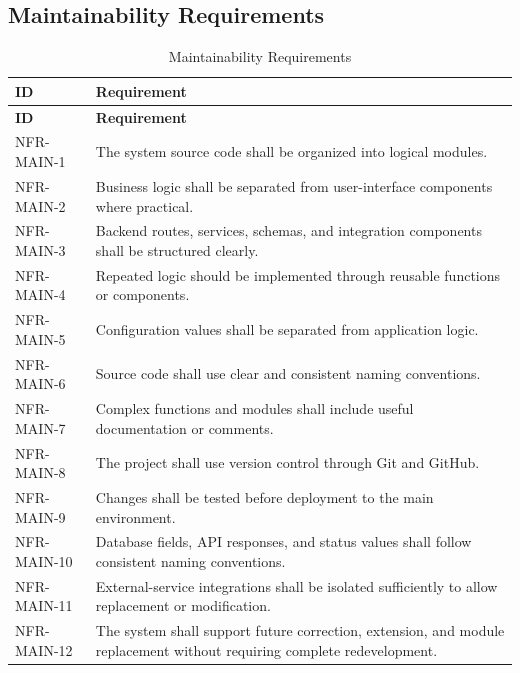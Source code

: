 \subsection{Maintainability Requirements}
\begin{longtable}{@{}p{2.6cm}p{10.8cm}@{}}
\caption{Maintainability Requirements} \label{tab:nfr-main} \\
\toprule \textbf{ID} & \textbf{Requirement} \\ \midrule
\endfirsthead
\toprule \textbf{ID} & \textbf{Requirement} \\ \midrule
\endhead
NFR-MAIN-1 & The system source code shall be organized into logical modules. \\
NFR-MAIN-2 & Business logic shall be separated from user-interface components where practical. \\
NFR-MAIN-3 & Backend routes, services, schemas, and integration components shall be structured clearly. \\
NFR-MAIN-4 & Repeated logic should be implemented through reusable functions or components. \\
NFR-MAIN-5 & Configuration values shall be separated from application logic. \\
NFR-MAIN-6 & Source code shall use clear and consistent naming conventions. \\
NFR-MAIN-7 & Complex functions and modules shall include useful documentation or comments. \\
NFR-MAIN-8 & The project shall use version control through Git and GitHub. \\
NFR-MAIN-9 & Changes shall be tested before deployment to the main environment. \\
NFR-MAIN-10 & Database fields, API responses, and status values shall follow consistent naming conventions. \\
NFR-MAIN-11 & External-service integrations shall be isolated sufficiently to allow replacement or modification. \\
NFR-MAIN-12 & The system shall support future correction, extension, and module replacement without requiring complete redevelopment. \\
\bottomrule
\end{longtable}

